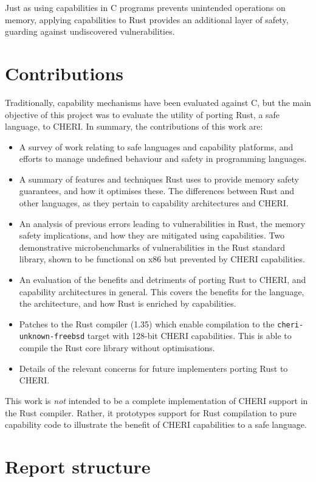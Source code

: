 \documentclass[dissertation.tex]{subfiles}
\begin{document}
Just as using capabilities in C programs prevents unintended operations
on memory, applying capabilities to Rust provides an additional layer of
safety, guarding against undiscovered vulnerabilities.


\section{Contributions}
\label{sec:intro-contrib}

Traditionally, capability mechanisms have been evaluated against C, but
the main objective of this project was to evaluate the utility of
porting Rust, a safe language, to CHERI.
In summary, the contributions of this work are:


\begin{itemize}
    \item A survey of work relating to safe languages and capability
    platforms, and efforts to manage undefined behaviour and safety in
    programming languages.

    \item A summary of features and techniques Rust uses to provide
    memory safety guarantees, and how it optimises these.
    The differences between Rust and other languages, as they pertain to
    capability architectures and CHERI.

    \item An analysis of previous errors leading to vulnerabilities in
    Rust, the memory safety implications, and how they are mitigated
    using capabilities.
    Two demonstrative microbenchmarks of vulnerabilities in the Rust
    standard library, shown to be functional on x86 but prevented by
    CHERI capabilities.

    \item An evaluation of the benefits and detriments of porting Rust
    to CHERI, and capability architectures in general.
    This covers the benefits for the language, the architecture, and how
    Rust is enriched by capabilities.

    \item Patches to the Rust compiler (1.35) which enable compilation
    to the \texttt{cheri-unknown-freebsd} target with 128-bit CHERI
    capabilities.
    This is able to compile the Rust core library without optimisations.

    \item Details of the relevant concerns for future implementers
    porting Rust to CHERI.
\end{itemize}

This work is \emph{not} intended to be a complete implementation of
CHERI support in the Rust compiler.
Rather, it prototypes support for Rust compilation to pure capability
 code to illustrate the benefit of CHERI
capabilities to a safe language.


\section{Report structure}
\todo{}
\end{document}
